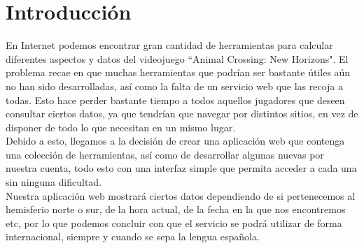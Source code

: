 \chapter{Introducción}\label{introduccion}

En Internet podemos encontrar gran cantidad de herramientas para calcular diferentes aspectos y datos del videojuego ``Animal Crossing: New Horizons". El problema recae en que muchas herramientas que podrían ser bastante útiles aún no han sido desarrolladas, así como la falta de un servicio web que las recoja a todas. Esto hace perder bastante tiempo a todos aquellos jugadores que deseen consultar ciertos datos, ya que tendrían que navegar por distintos sitios, en vez de disponer de todo lo que necesitan en un mismo lugar.\\

Debido a esto, llegamos a la decisión de crear una aplicación web que contenga una colección de herramientas, así como de desarrollar algunas nuevas por nuestra cuenta, todo esto con una interfaz simple que permita acceder a cada una sin ninguna dificultad.\\

Nuestra aplicación web mostrará ciertos datos dependiendo de si pertenecemos al hemisferio norte o sur, de la hora actual, de la fecha en la que nos encontremos etc, por lo que podemos concluir con que el servicio se podrá utilizar de forma internacional, siempre y cuando se sepa la lengua española.
